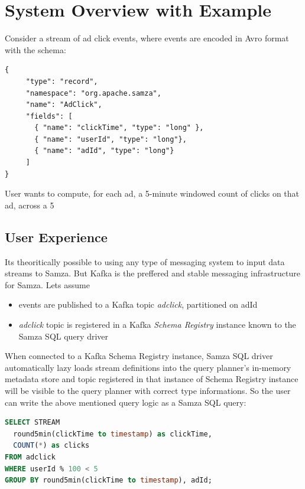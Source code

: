 \documentclass[10pt, conference, compsocconf]{IEEEtran}
\begin{document}
\section{System Overview with Example}
\label{sec:overview}
Consider a stream of ad click events, where events are encoded in Avro format with the schema:

\begin{lstlisting}
{
     "type": "record",
     "namespace": "org.apache.samza",
     "name": "AdClick",
     "fields": [
       { "name": "clickTime", "type": "long" },
       { "name": "userId", "type": "long"},
       { "name": "adId", "type": "long"}
     ]
}
\end{lstlisting}

User wants to compute, for each ad, a 5-minute windowed count of clicks on that ad, across a 5%

\subsection{User Experience}
Its theoritically possible to using any type of messaging system to input data streams to Samza. But Kafka is the preffered and stable messaging infrastructure for Samza. Lets assume 

\begin{itemize}
  \item events are published to a Kafka topic \textit{adclick}, partitioned on adId
  \item \textit{adclick} topic is registered in a Kafka \textit{Schema Registry} instance known to the Samza SQL query driver
\end{itemize}

When connected to a Kafka Schema Registry instance, Samza SQL driver automatically lazy loads stream definitions into the query planner's in-memory metadata store and topic registered in that instance of Schema Registry instance will be visible to the query planner with correct type informations. So the user can write the above mentioned  query logic as a Samza SQL query:

\begin{lstlisting}[language=SQL]
SELECT STREAM 
  round5min(clickTime to timestamp) as clickTime,
  COUNT(*) as clicks
FROM adclick
WHERE userId % 100 < 5
GROUP BY round5min(clickTime to timestamp), adId;
 \end{lstlisting}
\end{document}
